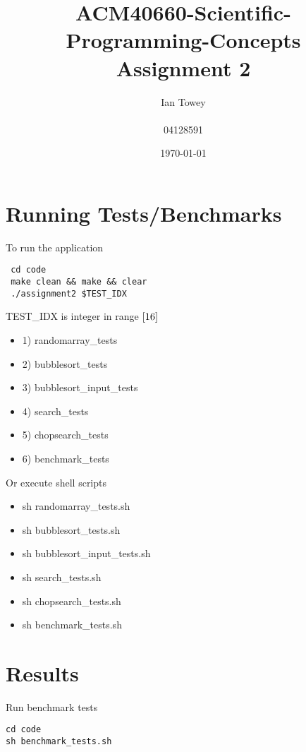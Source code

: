 \documentclass[a4paper]{article}
\title{ACM40660-Scientific-Programming-Concepts \\ Assignment 2}
\author{Ian Towey \\ \\ 04128591}
\date{\today}
\begin{document}
\maketitle
\tableofcontents
\newpage

\section{Running Tests/Benchmarks}

To run the application

\begin{verbatim}
 cd code
 make clean && make && clear
 ./assignment2 $TEST_IDX
\end{verbatim}  

\par
TEST\_IDX is integer in range $[1\-6]$  

\begin{itemize}
 \item 1) randomarray\_tests		
 \item 2) bubblesort\_tests		
 \item 3) bubblesort\_input\_tests			
 \item 4) search\_tests		
 \item 5) chopsearch\_tests	
 \item 6) benchmark\_tests		
\end{itemize}  

\par
Or execute shell scripts 

\begin{itemize}
 \item sh randomarray\_tests.sh		
 \item sh bubblesort\_tests.sh		
 \item sh bubblesort\_input\_tests.sh			
 \item sh search\_tests.sh		
 \item sh chopsearch\_tests.sh	
 \item sh benchmark\_tests.sh		
\end{itemize}

  
\section{Results}

Run benchmark tests
\begin{verbatim}
cd code
sh benchmark_tests.sh		
\end{verbatim}
\end{document}
